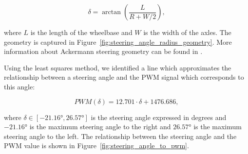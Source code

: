 \begin{equation}
\delta=\arctan\left(\dfrac{L}{R+W/2}\right),
\end{equation}

where $L$ is the length of the wheelbase and $W$ is the width of the axles. The geometry is captured in Figure~\ref{fig:steering_angle_radius_geometry}. More information about Ackermann steering geometry can be found in \cite{Rajamani_lateral_dynamics}.\texttt{}

Using the least squares method, we identified a line which approximates the relationship between a steering angle and the \gls*{PWM} signal which corresponds to this angle:

\begin{equation}
	PWM(\delta)=12.701\cdot\delta + 1476.686,
\end{equation}

where $\delta\in\left[\ang{-21.16}, \ang{26.57}\right]$ is the steering angle expressed in degrees and $\ang{-21.16}$ is the maximum steering angle to the right and $\ang{26.57}$ is the maximum steering angle to the left. The relationship between the steering angle and the \gls*{PWM} value is shown in Figure~\ref{fig:steering_angle_to_pwm}.

